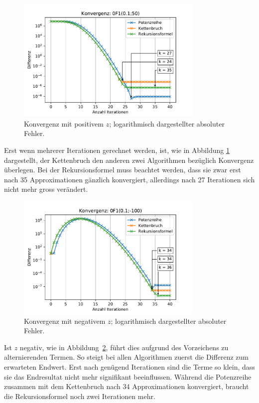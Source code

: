 \begin{figure}
    \centering
    \includegraphics[width=0.8\textwidth]{papers/0f1/images/konvergenzPositiv.pdf}
    \caption{Konvergenz mit positivem $z$; logarithmisch dargestellter absoluter Fehler.
    \label{0f1:ausblick:plot:konvergenz:positiv}}
\end{figure}

Erst wenn mehrerer Iterationen gerechnet werden, ist, wie in Abbildung \ref{0f1:ausblick:plot:konvergenz:positiv} dargestellt, der Kettenbruch den anderen zwei Algorithmen bezüglich Konvergenz überlegen. Bei der Rekursionsformel muss beachtet werden, dass sie zwar erst nach 35 Approximationen gänzlich konvergiert, allerdings nach 27 Iterationen sich nicht mehr gross verändert.

\begin{figure}
    \centering
    \includegraphics[width=0.8\textwidth]{papers/0f1/images/konvergenzNegativ.pdf}
    \caption{Konvergenz mit negativem $z$; logarithmisch dargestellter absoluter Fehler.
    \label{0f1:ausblick:plot:konvergenz:negativ}}
\end{figure}

Ist $z$ negativ, wie in Abbildung~\ref{0f1:ausblick:plot:konvergenz:negativ},
führt dies aufgrund des Vorzeichens zu alternierenden Termen. So steigt bei allen Algorithmen zuerst die Differenz zum erwarteten Endwert. Erst nach genügend Iterationen sind die Terme so klein, dass sie das Endresultat nicht mehr signifikant beeinflussen. Während die Potenzreihe zusammen mit dem Kettenbruch nach 34 Approximationen konvergiert, braucht die Rekursionsformel noch zwei Iterationen mehr.  


